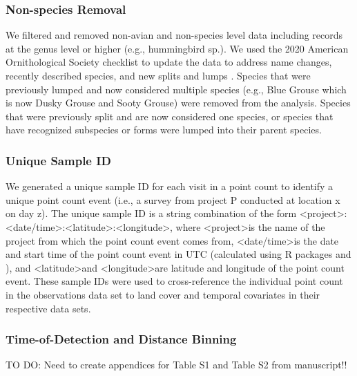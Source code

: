 \subsubsection{Non-species Removal}
\par We filtered and removed non-avian and non-species level data including records at the genus level or higher (e.g., hummingbird sp.). We used the 2020 American Ornithological Society checklist to update the data to address name changes, recently described species, and new splits and lumps \citep{chesser_sixty-first_2020}. Species that were previously lumped and now considered multiple species (e.g., Blue Grouse which is now Dusky Grouse and Sooty Grouse) were removed from the analysis. Species that were previously split and are now considered one species, or species that have recognized subspecies or forms were lumped into their parent species. 

\subsubsection{Unique Sample ID}
\par We generated a unique sample ID for each visit in a point count to identify a unique point count event (i.e., a survey from project P conducted at location x on day z). The unique sample ID is a string combination of the form \textless project\textgreater:\textless date/time\textgreater:\textless latitude\textgreater:\textless longitude\textgreater, where \textless project\textgreater is the name of the project from which the point count event comes from, \textless date/time\textgreater is the date and start time of the point count event in UTC (calculated using R packages \citep{teucher_lutz_2019} and \citep{urbanek_proj4_2020}), and \textless latitude\textgreater and \textless longitude\textgreater are latitude and longitude of the point count event. These sample IDs were used to cross-reference the individual point count in the observations data set to land cover and temporal covariates in their respective data sets.

\subsubsection{Time-of-Detection and Distance Binning}
\par TO DO: Need to create appendices for Table S1 and Table S2 from manuscript!!

